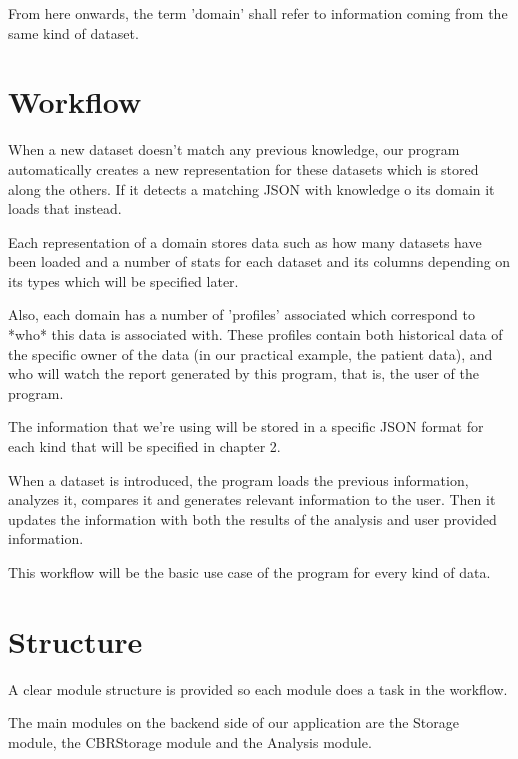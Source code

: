 From here onwards, the term 'domain' shall refer to information coming from the same kind of dataset.

\section{Workflow}
\label{cap1:sec:workflow}

When a new dataset doesn't match any previous knowledge, our program automatically creates a new representation for these datasets which is stored along the others. If it detects a matching JSON with knowledge o its domain it loads that instead.

Each representation of a domain stores data such as how many datasets have been loaded and a number of stats for each dataset and its columns depending on its types which will be specified later.

Also, each domain has a number of 'profiles' associated which correspond to *who* this data is associated with. These profiles contain both historical data of the specific owner of the data (in our practical example, the patient data), and who will watch the report generated by this program, that is, the user of the program.

The information that we're using will be stored in a specific JSON format for each kind that will be specified in chapter 2.

When a dataset is introduced, the program loads the previous information, analyzes it, compares it and generates relevant information to the user. Then it updates the information with both the results of the analysis and user provided information.

This workflow will be the basic use case of the program for every kind of data.

\section{Structure}
\label{cap1:sec:structure}
A clear module structure is provided so each module does a task in the workflow.

The main modules on the backend side of our application are the Storage module, the CBRStorage module and the Analysis module.

